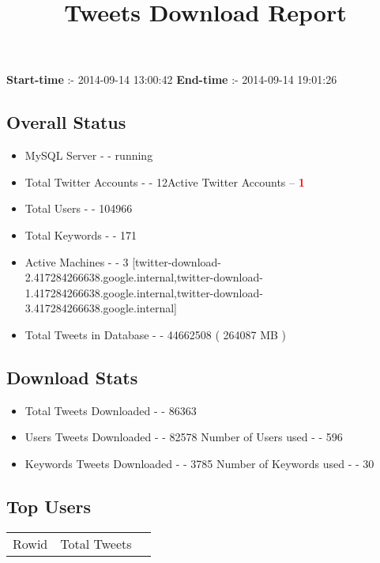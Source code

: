 \documentclass{article}\usepackage[T1]{fontenc}
\begin{document}
\title{\textbf{Tweets Download Report}}
               \date{}
                \maketitle
               \centerline{\textbf{Start-time} :- 2014-09-14 13:00:42 \hspace{40pt} \textbf{End-time} :- 2014-09-14 19:01:26}               \subsection*{Overall Status}                \begin{itemize}                \item MySQL Server - - running               \item Total Twitter Accounts - - 12\newline Active Twitter Accounts -- \textcolor{red}{\textbf{1}}               \item Total Users - - 104966               \item Total Keywords - - 171               \item Active Machines - - 3 [twitter-download-2.417284266638.google.internal,twitter-download-1.417284266638.google.internal,twitter-download-3.417284266638.google.internal]               \item Total Tweets in Database - - 44662508 ( 264087 MB )               \end{itemize}               \subsection*{Download Stats}                \begin{itemize}                \item Total Tweets Downloaded - - 86363               \item Users Tweets Downloaded - - 82578 \newline Number of Users used - - 596               \item Keywords Tweets Downloaded - - 3785 \newline Number of Keywords used - - 30              \end{itemize}              \subsection*{Top Users}\begin{tabular}{|c|c|c|}         \hline         Rowid & Total Tweets \\ 

\end{tabular}
\end{document}
